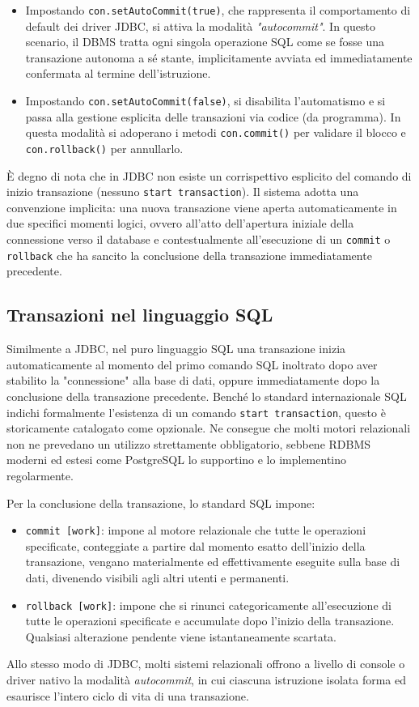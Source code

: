 \begin{itemize}
    \item Impostando \texttt{con.setAutoCommit(true)}, che rappresenta il comportamento di default dei driver JDBC, si attiva la modalità \textit{"autocommit"}. In questo scenario, il DBMS tratta ogni singola operazione SQL come se fosse una transazione autonoma a sé stante, implicitamente avviata ed immediatamente confermata al termine dell'istruzione.
    \item Impostando \texttt{con.setAutoCommit(false)}, si disabilita l'automatismo e si passa alla gestione esplicita delle transazioni via codice (da programma). In questa modalità si adoperano i metodi \texttt{con.commit()} per validare il blocco e \texttt{con.rollback()} per annullarlo.
\end{itemize}

È degno di nota che in JDBC non esiste un corrispettivo esplicito del comando di inizio transazione (nessuno \texttt{start transaction}). Il sistema adotta una convenzione implicita: una nuova transazione viene aperta automaticamente in due specifici momenti logici, ovvero all'atto dell'apertura iniziale della connessione verso il database e contestualmente all'esecuzione di un \texttt{commit} o \texttt{rollback} che ha sancito la conclusione della transazione immediatamente precedente.

\subsection{Transazioni nel linguaggio SQL}
Similmente a JDBC, nel puro linguaggio SQL una transazione inizia automaticamente al momento del primo comando SQL inoltrato dopo aver stabilito la "connessione" alla base di dati, oppure immediatamente dopo la conclusione della transazione precedente. Benché lo standard internazionale SQL indichi formalmente l'esistenza di un comando \texttt{start transaction}, questo è storicamente catalogato come opzionale. Ne consegue che molti motori relazionali non ne prevedano un utilizzo strettamente obbligatorio, sebbene RDBMS moderni ed estesi come PostgreSQL lo supportino e lo implementino regolarmente.

Per la conclusione della transazione, lo standard SQL impone:
\begin{itemize}
    \item \texttt{commit [work]}: impone al motore relazionale che tutte le operazioni specificate, conteggiate a partire dal momento esatto dell'inizio della transazione, vengano materialmente ed effettivamente eseguite sulla base di dati, divenendo visibili agli altri utenti e permanenti.
    \item \texttt{rollback [work]}: impone che si rinunci categoricamente all'esecuzione di tutte le operazioni specificate e accumulate dopo l'inizio della transazione. Qualsiasi alterazione pendente viene istantaneamente scartata.
\end{itemize}
Allo stesso modo di JDBC, molti sistemi relazionali offrono a livello di console o driver nativo la modalità \textit{autocommit}, in cui ciascuna istruzione isolata forma ed esaurisce l'intero ciclo di vita di una transazione.

